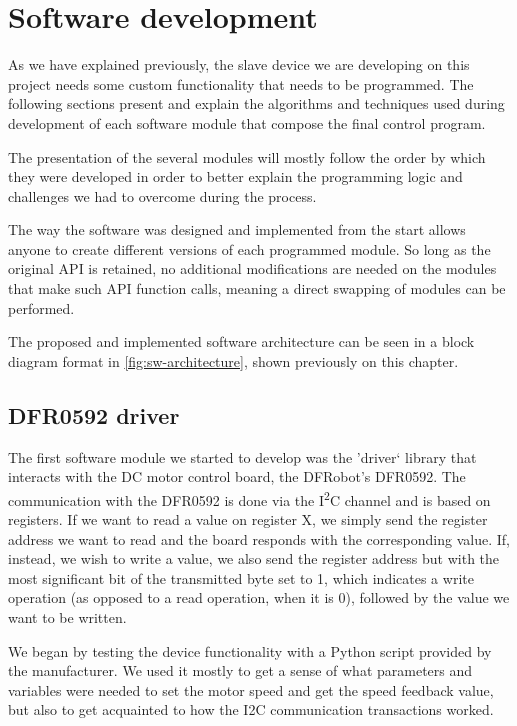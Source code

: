 \section{Software development} \label{sec:software-devel}
As we have explained previously, the slave device we are developing on this project needs some custom functionality that needs to be programmed.
The following sections present and explain the algorithms and techniques used during development of each software module that compose the final control program.

The presentation of the several modules will mostly follow the order by which they were developed in order to better explain the programming logic and challenges we had to overcome during the process.

The way the software was designed and implemented from the start allows anyone to create different versions of each programmed module.
So long as the original API is retained, no additional modifications are needed on the modules that make such API function calls, meaning a direct swapping of modules can be performed.

The proposed and implemented software architecture can be seen in a block diagram format in \autoref{fig:sw-architecture}, shown previously on this chapter.

\subsection{DFR0592 driver}
The first software module we started to develop was the 'driver` library that interacts with the DC motor control board, the DFRobot's DFR0592.
The communication with the DFR0592 is done via the I\textsuperscript{2}C channel and is based on registers.
If we want to read a value on register X, we simply send the register address we want to read and the board responds with the corresponding value.
If, instead, we wish to write a value, we also send the register address but with the most significant bit of the transmitted byte set to 1, which indicates a write operation (as opposed to a read operation, when it is 0), followed by the value we want to be written.

We began by testing the device functionality with a Python \cite{sw:python} script provided by the manufacturer.
We used it mostly to get a sense of what parameters and variables were needed to set the motor speed and get the speed feedback value, but also to get acquainted to how the I2C communication transactions worked.

